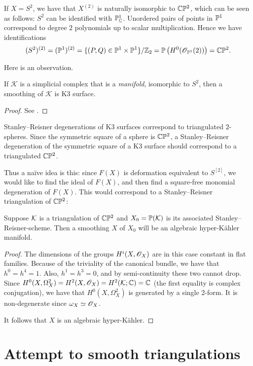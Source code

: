 If $X=S^2$, we have that $X^{(2)}$ is naturally isomorphic to $\C \P^2$, which can be seen as follows: $S^2$ can be identified with $\P^1_\C$. Unordered pairs of points in $\P^1$ correspond to degree $2$ polynomials up to scalar multiplication. Hence we have identifications
$$
(S^2)^{(2)} = (\P^1)^{(2)} = \{ (P,Q) \in \P^1 \times \P^1 \} / \Z_2 = \P\left( H^0(\OO_{\P^1}(2)) \right)=\C \P^2.
$$

Here is an observation.

\begin{lemma}
If $\mathcal K$ is a simplicial complex that is a \emph{manifold}, isomorphic to $S^2$, then a smoothing of $\mathcal K$ is K3 surface.
\end{lemma}
\begin{proof}
See \cite{eisenbud_graphcurves}.
\end{proof}

Stanley--Reisner degenerations of K3 surfaces correspond to triangulated $2$-spheres. Since the symmetric square of a sphere is $\C \P ^2$, a Stanley--Reisner degeneration of the symmetric square of a K3 surface should correspond to a triangulated $\C \P^2$. 

Thus a naïve idea is this: since $F(X)$ is deformation equivalent to $S^{[2]}$, we would like to find the ideal of $F(X)$, and then find a square-free monomial degeneration of $F(X)$. This would correspond to a Stanley--Reisner triangulation of $\C \P^2$:

\begin{proposition}
Suppose $\K$ is a triangulation of $\C \P^2$ and $X_0=\P(\K)$ is its associated Stanley--Reisner-scheme. Then a smoothing $X$ of $X_0$ will be an algebraic hyper-Kähler manifold.
\end{proposition}
\begin{proof}
The dimensions of the groups $H^i(X,\OO_X)$ are in this case constant in flat families. Because of the triviality of the canonical bundle, we have that $h^0=h^4=1$. Also, $h^1=h^3=0$, and by semi-continuity these two cannot drop. Since $H^0(X,\Omega^2_X)=H^2(X,\OO_X)=H^2(\K;\C)=\C$ (the first equality is complex conjugation), we have that $H^0(X,\Omega^2_X)$ is generated by a single 2-form. It is non-degenerate since $\omega_X \simeq \OO_X$.

It follows that $X$ is an algebraic hyper-Kähler.
\end{proof}

\section{Attempt to smooth triangulations}

